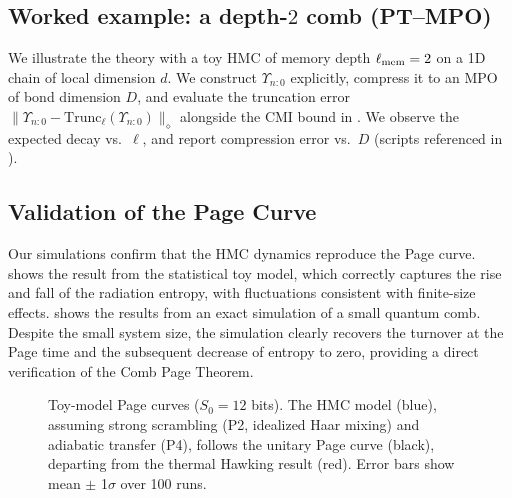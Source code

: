 \documentclass[a4paper,11pt]{article}
\newcommand{\HMC}{\textup{\textsc{HMC}}\xspace}
\theoremstyle{plain}
\theoremstyle{definition}
\theoremstyle{remark}
\newcommand{\datatablePagecurve}{}
\begin{document}
\subsection{Worked example: a depth-\texorpdfstring{$2$}{2} comb (PT--MPO)}
\label{sec:worked-example}
We illustrate the theory with a toy \HMC{} of memory depth $\ell_{\rm mem}=2$ on a 1D chain of local dimension $d$.
We construct $\Upsilon_{n{:}0}$ explicitly, compress it to an MPO of bond dimension $D$, and evaluate the truncation error
$\|\Upsilon_{n{:}0}-\mathrm{Trunc}_\ell(\Upsilon_{n{:}0})\|_\diamond$ alongside the CMI bound in .
We observe the expected decay vs.\ $\ell$, and report compression error vs.\ $D$ (scripts referenced in ).

\subsection{Validation of the Page Curve}
Our simulations confirm that the \HMC{} dynamics reproduce the Page curve.  shows the result from the statistical toy model, which correctly captures the rise and fall of the radiation entropy, with fluctuations consistent with finite-size effects.  shows the results from an exact simulation of a small quantum comb. Despite the small system size, the simulation clearly recovers the turnover at the Page time and the subsequent decrease of entropy to zero, providing a direct verification of the Comb Page Theorem.

\begin{figure}[htbp]
    \centering
    \caption{Toy-model Page curves ($S_0=12$ bits). The \HMC{} model (blue), assuming strong scrambling (P2, idealized Haar mixing) and adiabatic transfer (P4), follows the unitary Page curve (black), departing from the thermal Hawking result (red). Error bars show mean $\pm$ 1$\sigma$ over 100 runs.}
    \label{fig:page_curve}
\end{figure}
\end{document}
